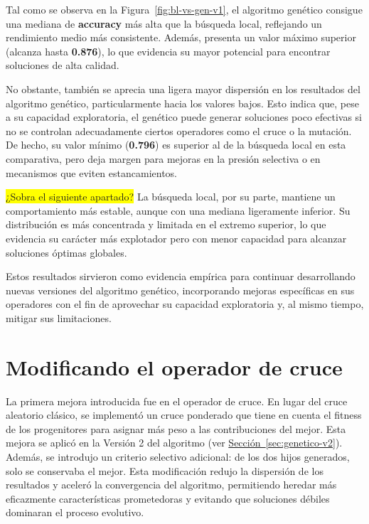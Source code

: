 Tal como se observa en la Figura~\ref{fig:bl-vs-gen-v1}, el algoritmo genético consigue una mediana de \textbf{accuracy} más alta que la búsqueda local,
reflejando un rendimiento medio más consistente.
Además, presenta un valor máximo superior (alcanza hasta \textbf{0.876}), lo que evidencia su mayor potencial para encontrar soluciones de alta calidad.

No obstante, también se aprecia una ligera mayor dispersión en los resultados del algoritmo genético, particularmente hacia los valores bajos.
Esto indica que, pese a su capacidad exploratoria, el genético puede generar soluciones poco efectivas si no se controlan adecuadamente ciertos operadores como el cruce o la mutación.
De hecho, su valor mínimo (\textbf{0.796}) es superior al de la búsqueda local en esta comparativa, pero deja margen para mejoras en la presión selectiva o en mecanismos que eviten estancamientos.

\colorbox{yellow}{¿Sobra el siguiente apartado?}
La búsqueda local, por su parte, mantiene un comportamiento más estable, aunque con una mediana ligeramente inferior.
Su distribución es más concentrada y limitada en el extremo superior, lo que evidencia su carácter más explotador pero con menor capacidad para alcanzar soluciones óptimas globales.

Estos resultados sirvieron como evidencia empírica para continuar desarrollando nuevas versiones del algoritmo genético,
incorporando mejoras específicas en sus operadores con el fin de aprovechar su capacidad exploratoria y, al mismo tiempo, mitigar sus limitaciones.

\section{Modificando el operador de cruce}\label{sec:incorporacion-cruce}
La primera mejora introducida fue en el operador de cruce.
En lugar del cruce aleatorio clásico, se implementó un cruce ponderado que tiene en cuenta el fitness de los progenitores para asignar más peso a las contribuciones del mejor.
Esta mejora se aplicó en la Versión 2 del algoritmo (ver \hyperref[sec:genetico-v2]{Sección~\ref*{sec:genetico-v2}}).
Además, se introdujo un criterio selectivo adicional: de los dos hijos generados, solo se conservaba el mejor.
Esta modificación redujo la dispersión de los resultados y aceleró la convergencia del algoritmo, permitiendo heredar más eficazmente características prometedoras y evitando que soluciones débiles dominaran el proceso evolutivo.

